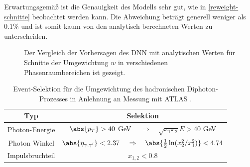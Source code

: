 Erwartungsgemäß ist die Genauigkeit des Modells sehr gut, wie in \textsf{\autoref{reweight-schnitte}} beobachtet werden kann. Die Abweichung beträgt generell weniger als $0.1\%$ und ist somit kaum von den analytisch berechneten Werten zu unterscheiden. 
\begin{figure}[htb]
	\centering
	\caption{Der Vergleich der Vorhersagen des DNN mit analytischen Werten für Schnitte der Umgewichtung $w$ in verschiedenen Phasenraumbereichen ist gezeigt.}
	\label{reweight-schnitte}
\end{figure}
\begin{table}[b]
	\centering
	\caption{Event-Selektion für die Umgewichtung des hadronischen Diphoton-Prozesses in Anlehnung an Messung mit ATLAS \cite{Cuts-Paper}.}
	\begin{tabular}{|c|c|}
		\hline
		Typ & Selektion \\
		\hline
		Photon-Energie & $\abs{p_T} > 40$ GeV $\quad \Rightarrow \quad \sqrt{x_1 x_2}E > 40$ GeV \\
		Photon Winkel & $\abs{\eta_{\gamma, \gamma'}} < 2.37$ $ \quad \Rightarrow \quad \abs{\frac{1}{2}\ln({x_2^2}/{x_1^2})} < 4.74$ \\
		Impulsbruchteil & $x_{1,2} < 0.8 $\\
		\hline
	\end{tabular}
	\label{reweight-selektionen}
\end{table}
